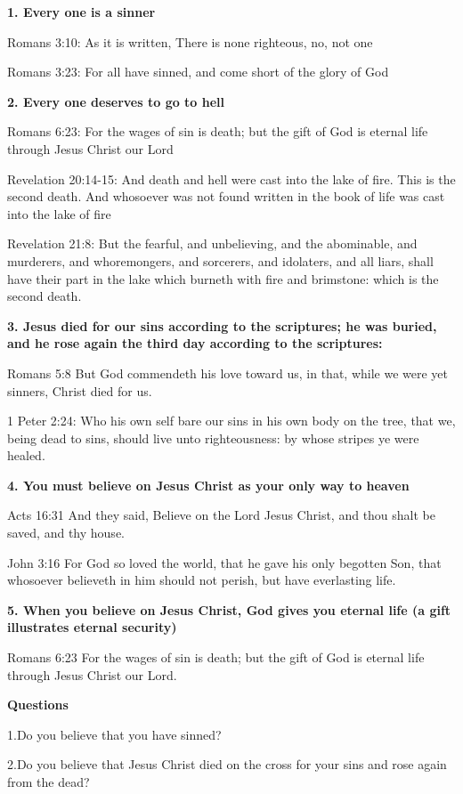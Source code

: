 \textbf{1. Every one is a sinner}

Romans 3:10: As it is written, There is none righteous, no, not one

Romans 3:23: For all have sinned, and come short of the glory of God


\textbf{2. Every one deserves to go to hell}

Romans 6:23: For the wages of sin is death; but the gift of God is eternal life through Jesus Christ our Lord

Revelation 20:14-15:  And death and hell were cast into the lake of fire. This is the second death.  And whosoever was not found written in the book of life was cast into the lake of fire

Revelation 21:8:  But the fearful, and unbelieving, and the abominable, and murderers, and whoremongers, and sorcerers, and idolaters, and all liars, shall have their part in the lake which burneth with fire and brimstone: which is the second death.


\textbf{3. Jesus died for our sins according to the scriptures; he was buried, and he rose again the third day according to the scriptures:}

Romans 5:8 But God commendeth his love toward us, in that, while we were yet sinners, Christ died for us.

1 Peter 2:24: Who his own self bare our sins in his own body on the tree, that we, being dead to sins, should live unto righteousness: by whose stripes ye were healed.


\textbf{4. You must believe on Jesus Christ as your only way to heaven}

Acts 16:31  And they said, Believe on the Lord Jesus Christ, and thou shalt be saved, and thy house.

John 3:16  For God so loved the world, that he gave his only begotten Son, that whosoever believeth in him should not perish, but have everlasting life.


\textbf{5. When you believe on Jesus Christ, God gives you eternal life (a gift illustrates eternal security)}

Romans 6:23  For the wages of sin is death; but the gift of God is eternal life through Jesus Christ our Lord.


\textbf{Questions}

  1.\hspace{0.6em}Do you believe that you have sinned?

  2.\hspace{0.6em}Do you believe that Jesus Christ died on the cross for your sins and rose again from the dead?

